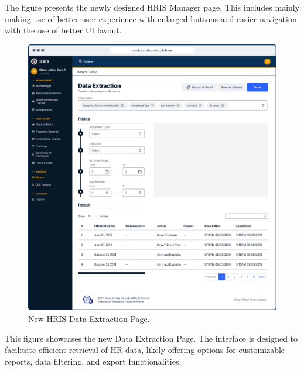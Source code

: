     The figure presents the newly designed HRIS Manager page. This includes mainly making use of better user experience with enlarged buttons and easier navigation with the use of better UI layout.

    \begin{figure}[H]
        \centering
        \includegraphics[width=1\linewidth]{figures/app/data-extraction.png}
        \caption{New HRIS Data Extraction Page.}
        \label{fig:enter-label}
    \end{figure}

    This figure showcases the new Data Extraction Page. The interface is designed to facilitate efficient retrieval of HR data, likely offering options for customizable reports, data filtering, and export functionalities.


